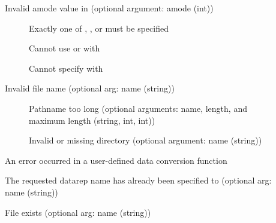 \begin{description}
\item[ ]Invalid amode value in
  (optional argument: amode (int))
    \begin{description}
    \item[
    ]Exactly one of 
      , , or
       must be specified
    \item[
    ]Cannot use 
       or  with
    \item[ ]Cannot specify
       with 
    \end{description}
\item[ ]Invalid file name
    (optional arg: name 
  (string)) 
    \begin{description}
    \item[
  ]Pathname too long (optional 
      arguments: name, length, and maximum length (string, int, int))
    \item[ ]Invalid
  or missing directory 
      (optional argument: name (string))
    \end{description}
\item[ ]An error
  occurred in a user-defined data 
  conversion function
\item[ ]The requested
  datarep name has already 
  been specified to  (optional arg: name
  (string))
\item[ ]File exists
  (optional arg: name (string)) 

\end{description}
